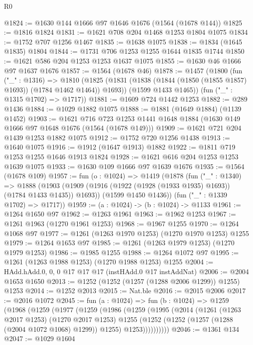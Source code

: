 \begin{lexlean}{R0}
\begin{coremodule}
@1824 := @1630 @144 @1666 @97 @1646 @1676 (@1564 (@1678 @144))
@1825 := @1816 @1824
@1831 := @1621 @708 @204 @1468 @1253 @1804 @1075
@1834 := @1752 @707 @1256 @1467
@1835 := @1638 @1075
@1838 := @1834 (@1645 @1835) @1804
@1844 := @1731 @706 @1253 @1255 @1644 @1835 @1744
@1850 := @1621 @586 @204 @1253 @1253 @1637 @1075
@1855 := @1630 @46 @1666 @97 @1637 @1676
@1857 := @1564 (@1678 @46)
@1878 := @1457
    (@1800
      (fun ("_" : @1316) =>
      @1810
        (@1825 (@1831 (@1838 (@1844 (@1850 (@1855 @1857) @1693)) (@1784 @1462 @1464)) @1693))
        (@1599 @1433 @1465))
      (fun ("_" : @1315 @1702) => @1717))
@1881 := @1609 @724 @1442 @1253
@1882 := @289 @1436
@1884 := @1029 @1882 @1075
@1888 := @1881 (@1649 @1884) (@1139 @1452)
@1903 := @1621
    @716
    @723
    @1253
    @1441
    @1648
    @1884
    (@1630 @149 @1666 @97 @1648 @1676 (@1564 (@1678 @149)))
@1909 := @1621 @721 @204 @1439 @1253 @1882 @1075
@1912 := @1752 @720 @1256 @1438
@1913 := @1640 @1075
@1916 := @1912 (@1647 @1913) @1882
@1922 := @1811 @719 @1253 @1255 @1646 @1913 @1824
@1928 := @1621 @616 @204 @1253 @1253 @1639 @1075
@1933 := @1630 @109 @1666 @97 @1639 @1676
@1935 := @1564 (@1678 @109)
@1957 := fun (o : @1024) =>
  @1419
    (@1878
      (fun ("_" : @1340) =>
      @1888
        (@1903 (@1909 (@1916 (@1922 (@1928 (@1933 @1935) @1693)) (@1784 @1433 @1435)) @1693))
        (@1599 @1450 @1436))
      (fun ("_" : @1339 @1702) => @1717))
@1959 := (a : @1024) -> (b : @1024) -> @1133
@1961 := @1264 @1650 @97
@1962 := @1263 @1961
@1963 := @1962 @1253
@1967 := @1261 @1963 (@1270 @1961 @1253)
@1968 := @1967 @1255
@1970 := @1264 @1068 @97
@1977 := @1261 (@1263 @1970 @1253) (@1270 @1970 @1253) @1255
@1979 := @1264 @1653 @97
@1985 := @1261 (@1263 @1979 @1253) (@1270 @1979 @1253)
@1986 := @1985 @1255
@1988 := @1264 @1072 @97
@1995 := @1261 (@1263 @1988 @1253) (@1270 @1988 @1253) @1255
@2004 := HAdd.hAdd.{0, 0, 0} @17 @17 @17 (instHAdd.{0} @17 instAddNat)
@2006 := @2004 @1653 @1650
@2013 := @1252 (@1252 (@1257 (@1288 @2006 @1299)) @1255) @1253
@2014 := @1252 @2013
@2015 := Nat.ble
@2016 := @2015 @2006
@2017 := @2016 @1072
@2045 := fun (a : @1024) =>
  fun (b : @1024) =>
  @1259
    (@1968
      (@1259
        (@1977
          (@1259
            (@1986
              (@1259
                (@1995
                  (@2014
                    (@1261
                      (@1263 @2017 @1253)
                      (@1270 @2017 @1253)
                      @1255
                      (@1252 (@1252 (@1257 (@1288 (@2004 @1072 @1068) @1299)) @1255) @1253))))))))))
@2046 := @1361 @134
@2047 := @1029 @1604

\end{coremodule}
\end{lexlean}
